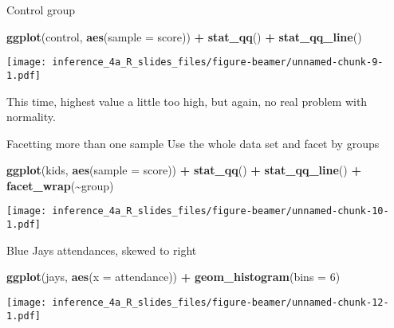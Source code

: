 \documentclass[
  ignorenonframetext,
]{beamer}
\newenvironment{Shaded}{\begin{snugshade}}{\end{snugshade}}
\newcommand{\DataTypeTok}[1]{\textcolor[rgb]{0.13,0.29,0.53}{#1}}
\newcommand{\DecValTok}[1]{\textcolor[rgb]{0.00,0.00,0.81}{#1}}
\newcommand{\KeywordTok}[1]{\textcolor[rgb]{0.13,0.29,0.53}{\textbf{#1}}}
\newcommand{\NormalTok}[1]{#1}
\newcommand{\OperatorTok}[1]{\textcolor[rgb]{0.81,0.36,0.00}{\textbf{#1}}}
\newcommand{\StringTok}[1]{\textcolor[rgb]{0.31,0.60,0.02}{#1}}
\begin{document}
\begin{frame}[fragile]{Control group}
\protect\hypertarget{control-group}{}
\begin{Shaded}
\begin{Highlighting}[]
\KeywordTok{ggplot}\NormalTok{(control, }\KeywordTok{aes}\NormalTok{(}\DataTypeTok{sample =}\NormalTok{ score)) }\OperatorTok{+}\StringTok{ }
\StringTok{  }\KeywordTok{stat\_qq}\NormalTok{() }\OperatorTok{+}\StringTok{ }\KeywordTok{stat\_qq\_line}\NormalTok{()}
\end{Highlighting}
\end{Shaded}

\texttt{[image: inference\_4a\_R\_slides\_files/figure-beamer/unnamed-chunk-9-1.pdf]}

This time, highest value a little too high, but again, no real problem
with normality.
\end{frame}

\begin{frame}[fragile]{Facetting more than one sample}
\protect\hypertarget{facetting-more-than-one-sample}{}
Use the whole data set and facet by groups

\begin{Shaded}
\begin{Highlighting}[]
\KeywordTok{ggplot}\NormalTok{(kids, }\KeywordTok{aes}\NormalTok{(}\DataTypeTok{sample =}\NormalTok{ score)) }\OperatorTok{+}\StringTok{ }
\StringTok{  }\KeywordTok{stat\_qq}\NormalTok{() }\OperatorTok{+}\StringTok{ }\KeywordTok{stat\_qq\_line}\NormalTok{() }\OperatorTok{+}\StringTok{ }\KeywordTok{facet\_wrap}\NormalTok{(}\OperatorTok{\textasciitilde{}}\NormalTok{group)}
\end{Highlighting}
\end{Shaded}

\texttt{[image: inference\_4a\_R\_slides\_files/figure-beamer/unnamed-chunk-10-1.pdf]}
\end{frame}

\begin{frame}[fragile]{Blue Jays attendances, skewed to right}
\protect\hypertarget{blue-jays-attendances-skewed-to-right}{}
\begin{Shaded}
\begin{Highlighting}[]
\KeywordTok{ggplot}\NormalTok{(jays, }\KeywordTok{aes}\NormalTok{(}\DataTypeTok{x =}\NormalTok{ attendance)) }\OperatorTok{+}\StringTok{ }\KeywordTok{geom\_histogram}\NormalTok{(}\DataTypeTok{bins =} \DecValTok{6}\NormalTok{)}
\end{Highlighting}
\end{Shaded}

\texttt{[image: inference\_4a\_R\_slides\_files/figure-beamer/unnamed-chunk-12-1.pdf]}
\end{frame}
\end{document}
